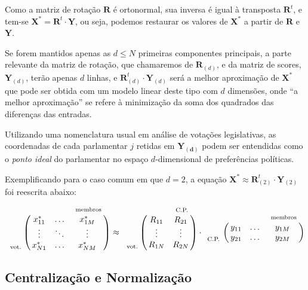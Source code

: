 \documentclass[a4paper, 12pt]{article}
\let\bbordermatrix\bordermatrix
\begin{document}


Como a matriz de rotação $\mathbf{R}$ é ortonormal, sua inversa é igual à transposta $\mathbf{R}^{t}$, e tem-se $\mathbf{X^{*}} = \mathbf{R}^t \cdot \mathbf{Y}$, ou seja, podemos restaurar os valores de $\mathbf{X^{*}}$ a partir de $\mathbf{R}$ e $\mathbf{Y}$.

Se forem mantidos apenas as $d \leq N$ primeiras componentes principais, a parte relevante da matriz de rotação, que chamaremos de $\mathbf{R}_{(d)}$, e da matriz de scores, $\mathbf{Y}_{(d)}$, terão apenas $d$ linhas, e $\mathbf{R}_{(d)}^{t}\cdot \mathbf{Y}_{(d)}$ será a melhor aproximação de $\mathbf{X^{*}}$ que pode ser obtida com um modelo linear deste tipo com $d$ dimensões, onde ``a melhor aproximação'' se refere à minimização da soma dos quadrados das diferenças das entradas.


Utilizando uma nomenclatura usual em análise de votações legislativas, as coordenadas de cada parlamentar $j$ retidas em $\mathbf{Y_{(d)}}$ podem ser entendidas como o \emph{ponto ideal} do parlamentar no espaço $d$-dimensional de preferências políticas.

Exemplificando para o caso comum em que $d=2$, a equação $\mathbf{X^{*}} \approx \mathbf{R}_{(2)}^{t} \cdot \mathbf{Y}_{(2)}$ foi reescrita abaixo:
\[
  \bbordermatrix{~  & ~ & ~ & ~_\text{membros} \cr
                ~ & x^{*}_{11} & \ldots & x^{*}_{1M}   \cr
                ~ & \vdots & \ddots & \vdots  \cr
                ~_\text{vot.} & x^{*}_{N1} & \ldots & x^{*}_{NM}   \cr
                } \approx
  \bbordermatrix{~  & ~ & ~_\text{C.P.} \cr
                ~ & R_{11} & R_{21}   \cr
                ~ & \vdots & \vdots  \cr
                ~_\text{vot.} & R_{1N} & R_{2N} \cr
                } \cdot
  \bbordermatrix{~  & ~ & ~ & ~_\text{membros} \cr
                ~ & y_{11} & \ldots & y_{1M}   \cr
                ~_\text{C.P.} & y_{21} & \ldots & y_{2M}   \cr
                }
\]


\subsection{Centralização e Normalização}
\end{document}

